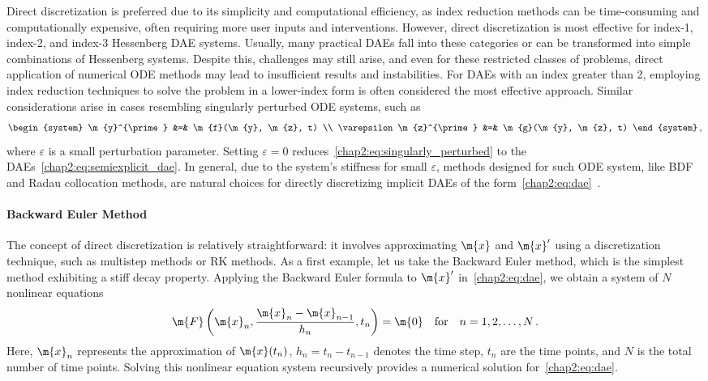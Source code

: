 Direct discretization is preferred due to its simplicity and computational efficiency, as index reduction methods can be time-consuming and computationally expensive, often requiring more user inputs and interventions. However, direct discretization is most effective for index-1, index-2, and index-3 Hessenberg \ac{DAE} systems. Usually, many practical \acp{DAE} fall into these categories or can be transformed into simple combinations of Hessenberg systems. Despite this, challenges may still arise, and even for these restricted classes of problems, direct application of numerical \ac{ODE} methods may lead to insufficient results and instabilities. For \acp{DAE} with an index greater than 2, employing index reduction techniques to solve the problem in a lower-index form is often considered the most effective approach. Similar considerations arise in cases resembling singularly perturbed \ac{ODE} systems, such as
%
\begin{equation}
  \begin{system}
  \m{y}^{\prime}             &=& \m{f}(\m{y}, \m{z}, t) \\
  \varepsilon \m{z}^{\prime} &=& \m{g}(\m{y}, \m{z}, t)
  \end{system} \, \text{,}
  \label{chap2:eq:singularly_perturbed}
\end{equation}
%
where $\varepsilon$ is a small perturbation parameter. Setting $\varepsilon = 0$ reduces~\eqref{chap2:eq:singularly_perturbed} to the \acp{DAE}~\eqref{chap2:eq:semiexplicit_dae}. In general, due to the system's stiffness for small $\varepsilon$, methods designed for such \ac{ODE} system, like \ac{BDF} and Radau collocation methods, are natural choices for directly discretizing implicit \acp{DAE} of the form~\eqref{chap2:eq:dae}~\cite{martinvaquero2010radau}.

\paragraph{Backward Euler Method}

The concept of direct discretization is relatively straightforward: it involves approximating $\m{x}$ and $\m{x}^{\prime}$ using a discretization technique, such as multistep methods or \ac{RK} methods. As a first example, let us take the Backward Euler method, which is the simplest method exhibiting a stiff decay property. Applying the Backward Euler formula to $\m{x}^{\prime}$ in~\eqref{chap2:eq:dae}, we obtain a system of $N$ nonlinear equations
%
\begin{equation}
  \m{F}\left(\m{x}_n, \dfrac{\m{x}_n - \m{x}_{n-1}}{h_n}, t_n\right) = \m{0} \quad \text{for} \quad n = 1, 2, \dots, N \, \text{.}
  \label{chap2:eq:backward_euler}
\end{equation}
%
Here, $\m{x}_n$ represents the approximation of $\m{x}(t_n)$, $h_n = t_n - t_{n-1}$ denotes the time step, $t_n$ are the time points, and $N$ is the total number of time points. Solving this nonlinear equation system recursively provides a numerical solution for~\eqref{chap2:eq:dae}.

